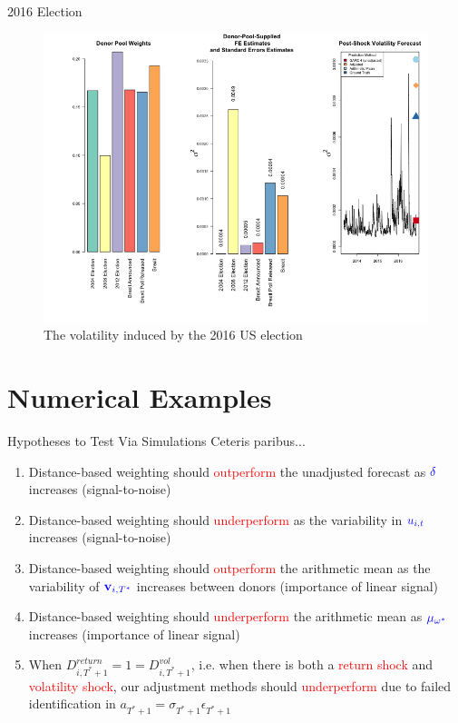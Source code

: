 \documentclass[9pt]{beamer}
\theoremstyle{definition}
\begin{document}
\begin{frame}{2016 Election}
    \begin{figure}[H]
        \begin{center}
          \includegraphics[scale=.34]{real_data_output_plots/TueSep241059512024_IYG_None_None.png}
          \caption{The volatility induced by the 2016 US election}
          \label{fig:SVF_2016}
          \end{center}
        \end{figure}
\end{frame}

\section{Numerical Examples}

\begin{frame}{Hypotheses to Test Via Simulations}
    Ceteris paribus...
    \begin{enumerate}
        \item <1-> Distance-based weighting should \textcolor{red}{outperform} the unadjusted forecast as $\textcolor{blue}{\delta}$ increases (signal-to-noise)
        \item <2-> Distance-based weighting should \textcolor{red}{underperform} as the variability in $\textcolor{blue}{u_{i,t}}$ increases (signal-to-noise)
        \item <3-> Distance-based weighting should \textcolor{red}{outperform} the arithmetic mean as the variability of $\textcolor{blue}{\textbf{v}_{i,T^{*}}}$ increases between donors (importance of linear signal)
        \item <4-> Distance-based weighting should \textcolor{red}{underperform} the arithmetic mean as $\textcolor{blue}{\mu_{\omega^{*}}}$ increases (importance of linear signal)
        \item <5-> When $D^{return}_{i,T^{*}+1} = 1 = D^{vol}_{i,T^{*}+1}$, i.e. when there is both a \textcolor{red}{return shock} and \textcolor{red}{volatility shock}, our adjustment methods should \textcolor{red}{underperform} due to failed identification in $a_{T^{*}+1} = \sigma_{T^{*}+1}\epsilon_{T^{*}+1}$
    \end{enumerate}
\end{frame}
\end{document}
